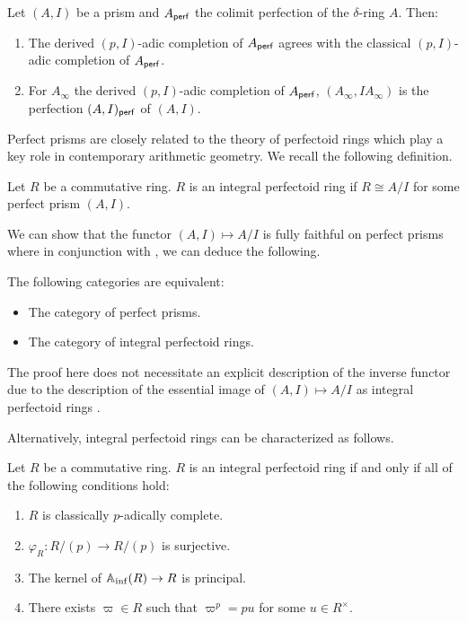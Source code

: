 \begin{proposition}\label{prop: perfection construction for prisms}
    Let $(A,I)$ be a prism and $A_{\mathsf{perf}}$ the colimit perfection of the $\delta$-ring $A$. Then:
    \begin{enumerate}[label=(\roman*)]
        \item The derived $(p,I)$-adic completion of $A_{\mathsf{perf}}$ agrees with the classical $(p,I)$-adic completion of $A_{\mathsf{perf}}$. 
        \item For $A_{\infty}$ the derived $(p,I)$-adic completion of $A_{\mathsf{perf}}$, $(A_{\infty},IA_{\infty})$ is the perfection $(A,I)_{\mathsf{perf}}$ of $(A,I)$. 
    \end{enumerate}
\end{proposition}
Perfect prisms are closely related to the theory of perfectoid rings which play a key role in contemporary arithmetic geometry. We recall the following definition. 
\begin{definition}\label{def: integral perfectoid ring}
    Let $R$ be a commutative ring. $R$ is an integral perfectoid ring if $R\cong A/I$ for some perfect prism $(A,I)$. 
\end{definition}
We can show that the functor $(A,I)\mapsto A/I$ is fully faithful on perfect prisms where in conjunction with , we can deduce the following. 
\begin{proposition}\label{prop: equivalence of categories perfect prisms and perfectoid rings}
    The following categories are equivalent:
    \begin{itemize}
        \item The category of perfect prisms. 
        \item The category of integral perfectoid rings. 
    \end{itemize}
\end{proposition}
\begin{remark}
    The proof here does not necessitate an explicit description of the inverse functor due to the description of the essential image of $(A,I)\mapsto A/I$ as integral perfectoid rings . 
\end{remark}
Alternatively, integral perfectoid rings can be characterized as follows. 
\begin{proposition}\label{prop: characterization of integral perfectoid rings}
    Let $R$ be a commutative ring. $R$ is an integral perfectoid ring if and only if all of the following conditions hold:
    \begin{enumerate}[label=(\roman*)]
        \item $R$ is classically $p$-adically complete. 
        \item $\varphi_{R}:R/(p)\to R/(p)$ is surjective. 
        \item The kernel of $\mathbb{A}_{\inf}(R)\to R$ is principal. 
        \item There exists $\varpi\in R$ such that $\varpi^{p}=pu$ for some $u\in R^{\times}$. 
    \end{enumerate}
\end{proposition}
